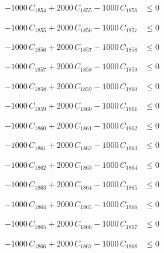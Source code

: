 \documentclass[a4paper,11pt]{article}
\begin{document}
\begin{align}
-1000\,C_{1854} + 2000\,C_{1855} - 1000\,C_{1856} &\leq 0 \nonumber
\end{align}

\begin{align}
-1000\,C_{1855} + 2000\,C_{1856} - 1000\,C_{1857} &\leq 0 \nonumber
\end{align}

\begin{align}
-1000\,C_{1856} + 2000\,C_{1857} - 1000\,C_{1858} &\leq 0 \nonumber
\end{align}

\begin{align}
-1000\,C_{1857} + 2000\,C_{1858} - 1000\,C_{1859} &\leq 0 \nonumber
\end{align}

\begin{align}
-1000\,C_{1858} + 2000\,C_{1859} - 1000\,C_{1860} &\leq 0 \nonumber
\end{align}

\begin{align}
-1000\,C_{1859} + 2000\,C_{1860} - 1000\,C_{1861} &\leq 0 \nonumber
\end{align}

\begin{align}
-1000\,C_{1860} + 2000\,C_{1861} - 1000\,C_{1862} &\leq 0 \nonumber
\end{align}

\begin{align}
-1000\,C_{1861} + 2000\,C_{1862} - 1000\,C_{1863} &\leq 0 \nonumber
\end{align}

\begin{align}
-1000\,C_{1862} + 2000\,C_{1863} - 1000\,C_{1864} &\leq 0 \nonumber
\end{align}

\begin{align}
-1000\,C_{1863} + 2000\,C_{1864} - 1000\,C_{1865} &\leq 0 \nonumber
\end{align}

\begin{align}
-1000\,C_{1864} + 2000\,C_{1865} - 1000\,C_{1866} &\leq 0 \nonumber
\end{align}

\begin{align}
-1000\,C_{1865} + 2000\,C_{1866} - 1000\,C_{1867} &\leq 0 \nonumber
\end{align}

\begin{align}
-1000\,C_{1866} + 2000\,C_{1867} - 1000\,C_{1868} &\leq 0 \nonumber
\end{align}
\end{document}
